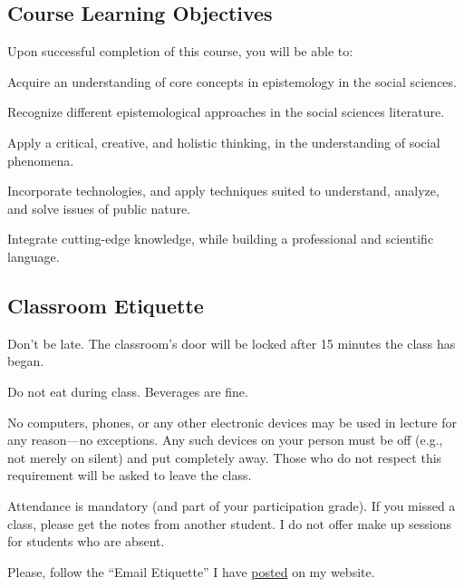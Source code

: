 \documentclass[letterpaper]{article}
\renewenvironment{itemize}{
  \begin{list}{}{
    \setlength{\leftmargin}{1.5em}
  }
}{
  \end{list}
}
\begin{document}
\subsection*{Course Learning Objectives}
 
Upon successful completion of this course, you will be able to:

\begin{itemize}
	\item[$\bullet$] Acquire an understanding of core concepts in epistemology in the social sciences. 
	\item[$\bullet$] Recognize different epistemological approaches in the social sciences literature.
	\item[$\bullet$] Apply a critical, creative, and holistic thinking, in the understanding of social phenomena.
	\item[$\bullet$] Incorporate technologies, and apply techniques suited to understand, analyze, and solve issues of public nature.
	\item[$\bullet$] Integrate cutting-edge knowledge, while building a professional and scientific language.
\end{itemize}


\subsection*{Classroom Etiquette}
 

\begin{itemize}
	\item[$\bullet$] Don't be late. The classroom's door will be locked after 15 minutes the class has began.
	\item[$\bullet$] Do not eat during class. Beverages are fine.
	\item[$\bullet$] No computers, phones, or any other electronic devices may be used in lecture for any reason---no exceptions. Any such devices on your person must be off (e.g., not merely on silent) and put completely away. Those who do not respect this requirement will be asked to leave the class.
	\item[$\bullet$] Attendance is mandatory (and part of your participation grade). If you missed a class, please get the notes from another student. I do not offer make up sessions for students who are absent.
	\item[$\bullet$] Please, follow the ``Email Etiquette'' I have \href{http://www.hectorbahamonde.com/resources/}{posted} on my website.
\end{itemize}
\end{document}
